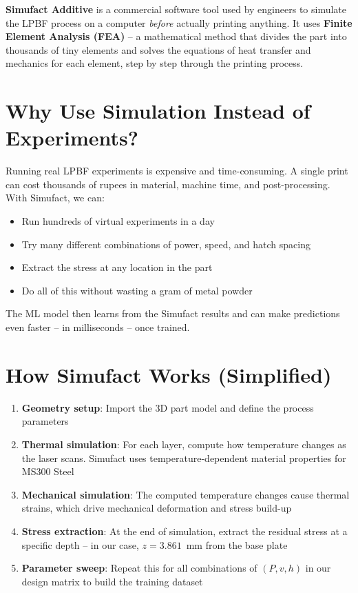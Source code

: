 \documentclass[12pt,a4paper]{report}
\begin{document}
\textbf{Simufact Additive} is a commercial software tool used by engineers to simulate the LPBF process on a computer \textit{before} actually printing anything. It uses \textbf{Finite Element Analysis (FEA)} -- a mathematical method that divides the part into thousands of tiny elements and solves the equations of heat transfer and mechanics for each element, step by step through the printing process.

\section{Why Use Simulation Instead of Experiments?}

Running real LPBF experiments is expensive and time-consuming. A single print can cost thousands of rupees in material, machine time, and post-processing. With Simufact, we can:

\begin{itemize}
  \item Run hundreds of virtual experiments in a day
  \item Try many different combinations of power, speed, and hatch spacing
  \item Extract the stress at any location in the part
  \item Do all of this without wasting a gram of metal powder
\end{itemize}

The ML model then learns from the Simufact results and can make predictions even faster -- in milliseconds -- once trained.

\section{How Simufact Works (Simplified)}

\begin{enumerate}
  \item \textbf{Geometry setup}: Import the 3D part model and define the process parameters
  \item \textbf{Thermal simulation}: For each layer, compute how temperature changes as the laser scans. Simufact uses temperature-dependent material properties for MS300 Steel
  \item \textbf{Mechanical simulation}: The computed temperature changes cause thermal strains, which drive mechanical deformation and stress build-up
  \item \textbf{Stress extraction}: At the end of simulation, extract the residual stress at a specific depth -- in our case, $z = 3.861$~mm from the base plate
  \item \textbf{Parameter sweep}: Repeat this for all combinations of $(P, v, h)$ in our design matrix to build the training dataset
\end{enumerate}
\end{document}
